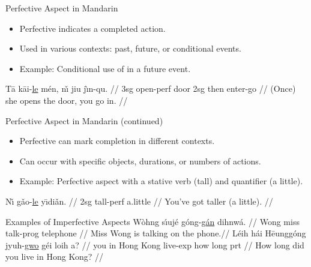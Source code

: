 \documentclass{beamer}
\newcommand{\cmn}{\mtciteform}
\newcommand{\ul}[1]{\uline{#1}}
\begin{document}
\begin{frame}{Perfective Aspect in Mandarin}
\begin{itemize}
    \item Perfective \cmn{le} indicates a completed action.
    \item Used in various contexts: past, future, or conditional events.
    \item Example: Conditional use of \cmn{le} in a future event.
\end{itemize}
\ex
\begingl
\gla Tā kāi-\ul{le} mén, nı̌ jiu jı̀n-qu. //
\glb 3sg open-perf door 2sg then enter-go //
\glft (Once) she opens the door, you go in. //
\endgl
\xe
\end{frame}

\begin{frame}{Perfective Aspect in Mandarin (continued)}
\begin{itemize}
    \item Perfective \cmn{le} can mark completion in different contexts.
    \item Can occur with specific objects, durations, or numbers of actions.
    \item Example: Perfective aspect with a stative verb (tall) and quantifier (a little).
\end{itemize}
\ex
\begingl
\gla Nı̌ gǎo-\ul{le} yı̄diǎn. //
\glb 2sg tall-perf a.little //
\glft You've got taller (a little). //
\endgl
\xe
\end{frame}


\begin{frame}{Examples of Imperfective Aspects}
\ex
\begingl
\gla Wòhng sı́ujé góng-\ul{gán} dihnwá. //
\glb Wong miss talk-prog telephone //
\glft Miss Wong is talking on the phone.//
\endgl
\xe
\ex
\begingl
\gla Léih hái Hēunggóng jyuh-\ul{gwo} géi loih a? //
\glb you in Hong Kong live-exp how long prt //
\glft How long did you live in Hong Kong? //
\endgl
\xe
\end{frame}
\end{document}
